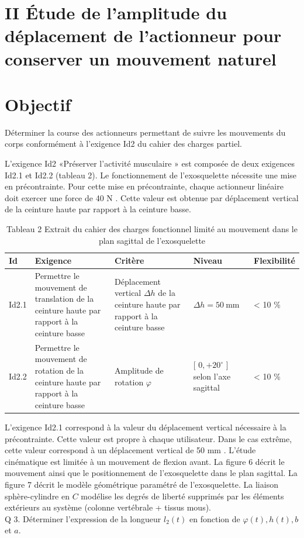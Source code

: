 \documentclass[10pt]{article}
\begin{document}
\section{II Étude de l'amplitude du déplacement de l'actionneur pour conserver un mouvement naturel}
\section{Objectif}
Déterminer la course des actionneurs permettant de suivre les mouvements du corps conformément à l'exigence Id2 du cahier des charges partiel.

L'exigence Id2 «Préserver l'activité musculaire » est composée de deux exigences Id2.1 et Id2.2 (tableau 2). Le fonctionnement de l'exosquelette nécessite une mise en précontrainte. Pour cette mise en précontrainte, chaque actionneur linéaire doit exercer une force de 40 N . Cette valeur est obtenue par déplacement vertical de la ceinture haute par rapport à la ceinture basse.

\begin{table}[h]
\begin{center}
\begin{tabular}{|l|l|l|l|l|}
\hline
Id & Exigence & Critère & Niveau & Flexibilité \\
\hline
Id2.1 & Permettre le mouvement de translation de la ceinture haute par rapport à la ceinture basse & Déplacement vertical $\Delta h$ de la ceinture haute par rapport à la ceinture basse & $\Delta h=50 \mathrm{~mm}$ & < 10 \% \\
\hline
Id2.2 & Permettre le mouvement de rotation de la ceinture haute par rapport à la ceinture basse & Amplitude de rotation $\varphi$ & [ $0,+20^{\circ}$ ] selon l'axe sagittal & < 10 \% \\
\hline
\end{tabular}
\captionsetup{labelformat=empty}
\caption{Tableau 2 Extrait du cahier des charges fonctionnel limité au mouvement dans le plan sagittal de l'exosquelette}
\end{center}
\end{table}

L'exigence Id2.1 correspond à la valeur du déplacement vertical nécessaire à la précontrainte. Cette valeur est propre à chaque utilisateur. Dans le cas extrême, cette valeur correspond à un déplacement vertical de 50 mm . L'étude cinématique est limitée à un mouvement de flexion avant. La figure 6 décrit le mouvement ainsi que le positionnement de l'exosquelette dans le plan sagittal. La figure 7 décrit le modèle géométrique paramétré de l'exosquelette. La liaison sphère-cylindre en $C$ modélise les degrés de liberté supprimés par les éléments extérieurs au système (colonne vertébrale + tissus mous).\\
Q 3. Déterminer l'expression de la longueur $l_{2}(t)$ en fonction de $\varphi(t), h(t), b$ et $a$.
\end{document}
